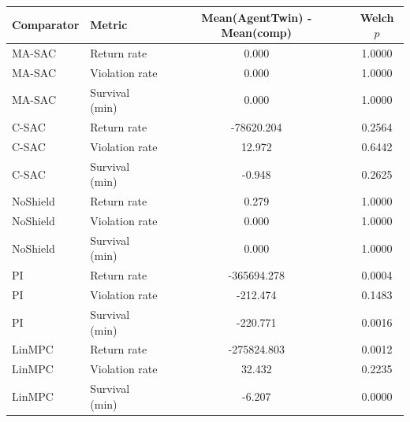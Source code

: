 \begin{tabular}{llcc}
\toprule
Comparator & Metric & Mean(AgentTwin) - Mean(comp) & Welch $p$\\
\midrule
MA-SAC & Return rate & 0.000 & 1.0000\\
MA-SAC & Violation rate & 0.000 & 1.0000\\
MA-SAC & Survival (min) & 0.000 & 1.0000\\
C-SAC & Return rate & -78620.204 & 0.2564\\
C-SAC & Violation rate & 12.972 & 0.6442\\
C-SAC & Survival (min) & -0.948 & 0.2625\\
NoShield & Return rate & 0.279 & 1.0000\\
NoShield & Violation rate & 0.000 & 1.0000\\
NoShield & Survival (min) & 0.000 & 1.0000\\
PI & Return rate & -365694.278 & 0.0004\\
PI & Violation rate & -212.474 & 0.1483\\
PI & Survival (min) & -220.771 & 0.0016\\
LinMPC & Return rate & -275824.803 & 0.0012\\
LinMPC & Violation rate & 32.432 & 0.2235\\
LinMPC & Survival (min) & -6.207 & 0.0000\\
\bottomrule
\end{tabular}